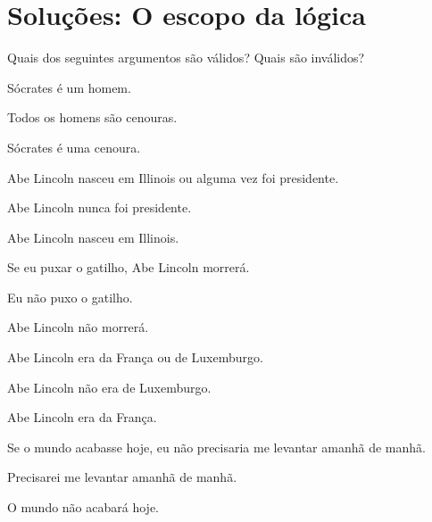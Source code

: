 \chapter{Soluções: O escopo da lógica}
\setcounter{ProbPart}{0}
\problempart
Quais dos seguintes argumentos são válidos? Quais são inválidos?
\begin{compactlist}
\item\begin{earg}
\item Sócrates é um homem.
\item Todos os homens são cenouras.
\item[\texttherefore]  Sócrates é uma cenoura. \hfill {}
\end{earg}

\item\begin{earg}
\item Abe Lincoln nasceu em Illinois ou alguma vez foi presidente.
\item Abe Lincoln nunca foi presidente.
\item[\texttherefore] Abe Lincoln nasceu em Illinois. \hfill {}
\end{earg}

\item\begin{earg}
\item Se eu puxar o gatilho, Abe Lincoln morrerá.
\item Eu não puxo o gatilho.
\item[\texttherefore] Abe Lincoln não morrerá. \hfill {}
\end{earg}

\item\begin{earg}
\item Abe Lincoln era da França ou de Luxemburgo.
\item Abe Lincoln não era de Luxemburgo.
\item[\texttherefore] Abe Lincoln era da França. \hfill {}
\end{earg}

\item\begin{earg}
\item Se o mundo acabasse hoje, eu não precisaria me levantar amanhã de manhã.
\item Precisarei me levantar amanhã de manhã.
\item[\texttherefore] O mundo não acabará hoje. \hfill {}
\end{earg}


\end{compactlist}
